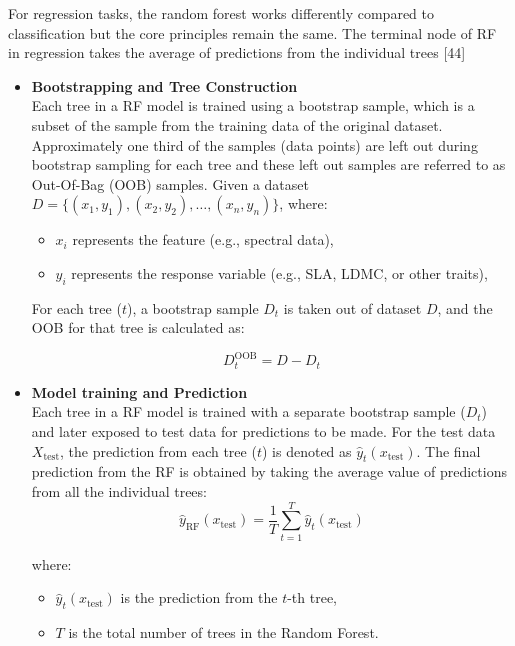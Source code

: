 \documentclass[12pt,a4paper]{report}
\begin{document}
For regression tasks, the random forest works differently compared to classification but the core principles remain the same. The terminal node of RF in regression takes the average of predictions from the individual trees [44]

\begin{itemize}
    \item \textbf{Bootstrapping and Tree Construction} \\
    Each tree in a RF model is trained using a bootstrap sample, which is a subset of the sample from the training data of the original dataset. Approximately one third of the samples (data points) are left out during bootstrap sampling for each tree and these left out samples are referred to as Out-Of-Bag (OOB) samples.
    Given a dataset \( D = \{ (x_1, y_1), (x_2, y_2), \dots, (x_n, y_n) \} \), where:
    \begin{itemize}
        \item \( x_i \) represents the feature (e.g., spectral data),
        \item \( y_i \) represents the response variable (e.g., SLA, LDMC, or other traits),
    \end{itemize}
    For each tree (\( t \)), a bootstrap sample \( D_t \) is taken out of dataset \( D \), and the OOB for that tree is calculated as:

    \begin{equation}
        D_t^{\text{OOB}} = D \mathbin{-} D_t 
    \end{equation}
    

    
    \item \textbf{Model training and Prediction} \\
    Each tree in a RF model is trained with a separate bootstrap sample (\( D_t \)) and later exposed to test data for predictions to be made.
    For the test data \( X_{\text{test}} \), the prediction from each tree (\( t \)) is denoted as \( \hat{y}_t(x_{\text{test}}) \). The final prediction from the RF is obtained by taking the average value of predictions from all the individual trees: \\

    \begin{equation}
        \hat{y}_{\text{RF}}(x_{\text{test}}) = \frac{1}{T} \sum_{t=1}^{T} \hat{y}_t(x_{\text{test}})
    \end{equation}
    
    where:
    \begin{itemize}
        \item \( \hat{y}_t(x_{\text{test}}) \) is the prediction from the \( t \)-th tree,
        \item \( T \) is the total number of trees in the Random Forest.
    \end{itemize}
\end{itemize}
\end{document}
